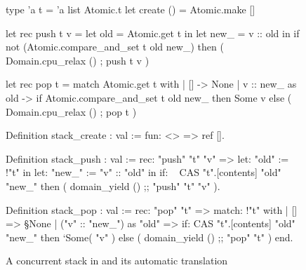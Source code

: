 \begin{figure}[tp]
\begin{minipage}[t]{0.42\textwidth}
\begin{ocamlcode}
type 'a t = 'a list Atomic.t
let create () = Atomic.make []

let rec push t v =
  let old = Atomic.get t in
  let new_ = v :: old in
  if not (Atomic.compare_and_set
            t old new_)
  then (
    Domain.cpu_relax () ;
    push t v
  )

let rec pop t =
  match Atomic.get t with
  | [] -> None
  | v :: new_ as old ->
      if Atomic.compare_and_set
           t old new_
      then Some v
      else (
        Domain.cpu_relax () ;
        pop t
      )
\end{ocamlcode}
\end{minipage}
\begin{minipage}[t]{0.49\textwidth}
\begin{coqcode}
Definition stack_create : val :=
  fun: <> => ref [].

Definition stack_push : val :=
  rec: "push" "t" "v" =>
    let: "old" := !"t" in
    let: "new_" := "v" :: "old" in
    if: ~ CAS "t".[contents] "old" "new_"
    then (
      domain_yield () ;;
      "push" "t" "v"
    ).

Definition stack_pop : val :=
  rec: "pop" "t" =>
    match: !"t" with
    | [] => §None
    | ("v" :: "new_") as "old" =>
        if: CAS "t".[contents] "old" "new_"
        then ‘Some( "v" )
        else (
          domain_yield () ;;
          "pop" "t"
        )
    end.

\end{coqcode}
\end{minipage}

\caption{A concurrent stack in \OCaml and its automatic \ZooLang translation}
\label{fig:stack}
\end{figure}

